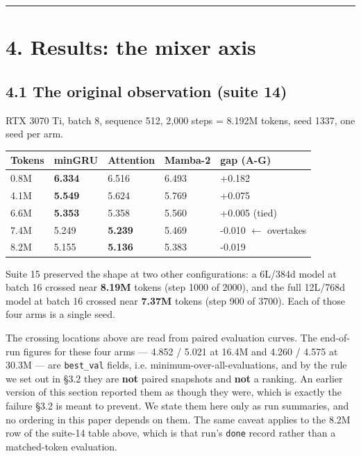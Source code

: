 \begin{center}\rule{0.5\linewidth}{0.5pt}\end{center}

\section{4. Results: the mixer axis}\label{results-the-mixer-axis}

\subsection{4.1 The original observation (suite 14)}\label{the-original-observation-suite-14}

RTX 3070 Ti, batch 8, sequence 512, 2,000 steps = 8.192M tokens, seed 1337, one seed per arm.

{%
{\small\begin{longtable}[]{@{}lllll@{}}
\toprule\noalign{}
Tokens & minGRU & Attention & Mamba-2 & gap (A-G) \\
\midrule\noalign{}
\endhead
\bottomrule\noalign{}
\endlastfoot
0.8M & \textbf{6.334} & 6.516 & 6.493 & +0.182 \\
4.1M & \textbf{5.549} & 5.624 & 5.769 & +0.075 \\
6.6M & \textbf{5.353} & 5.358 & 5.560 & +0.005 (tied) \\
7.4M & 5.249 & \textbf{5.239} & 5.469 & -0.010 $\leftarrow$ overtakes \\
8.2M & 5.155 & \textbf{5.136} & 5.383 & -0.019 \\
\end{longtable}}
}

Suite 15 preserved the shape at two other configurations: a 6L/384d model at batch 16 crossed near
\textbf{8.19M} tokens (step 1000 of 2000), and the full 12L/768d model at batch 16 crossed near
\textbf{7.37M} tokens (step 900 of 3700). Each of those four arms is a single seed.

The crossing locations above are read from paired evaluation curves. The end-of-run figures for
these four arms --- 4.852 / 5.021 at 16.4M and 4.260 / 4.575 at 30.3M --- are \texttt{best\_val} fields, i.e.
minimum-over-all-evaluations, and by the rule we set out in \S3.2 they are \textbf{not} paired snapshots
and \textbf{not} a ranking. An earlier version of this section reported them as though they were, which
is exactly the failure \S3.2 is meant to prevent. We state them here only as run summaries, and no
ordering in this paper depends on them. The same caveat applies to the 8.2M row of the suite-14
table above, which is that run's \texttt{done} record rather than a matched-token evaluation.

